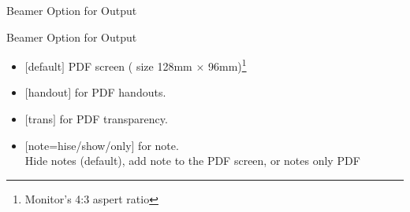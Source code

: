 \documentclass[9pt,blue,xcolor=pdftex,dvipsnames,table,handout,notes]{beamer}
\begin{document}
		\begin{frame}[t]{Beamer Option for Output}

			\begin{block} {Beamer Option for Output}
			\begin{itemize}
			\item	$[$default$]$ PDF screen ( size 128mm $\times$ 96mm)\footnote{ Monitor's 4:3 aspert ratio}
			\item	$[$handout$]$ for PDF handouts.
			\item	$[$trans$]$ for PDF transparency.
			\item	$[$note=hise/show/only$]$ for note. \\Hide notes (default), add note to the PDF screen, or notes only PDF
			\end{itemize}
			\end{block}



		\end{frame}








\end{document}
